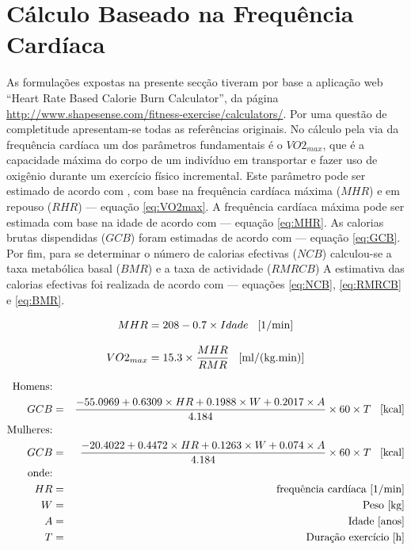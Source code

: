 \documentclass[a4paper,10pt]{report}
\begin{document}
\section{Cálculo Baseado na Frequência Cardíaca}
\label{sec:caloriasFcardio}
As formulações expostas na presente secção tiveram por base a aplicação web ``Heart Rate Based Calorie Burn Calculator'', 
da página \url{http://www.shapesense.com/fitness-exercise/calculators/}. Por uma questão de completitude apresentam-se todas as referências originais.
No cálculo pela via da frequência cardíaca um dos parâmetros fundamentais é o $VO2_{max}$, que é a capacidade máxima do corpo de um 
indivíduo em transportar e fazer uso de oxigênio durante um exercício físico incremental.
Este parâmetro pode ser estimado de acordo com \cite{VO2max}, com base na frequência cardíaca máxima ($MHR$) e em 
repouso ($RHR$) --- equação \ref{eq:VO2max}.
A frequência cardíaca máxima pode ser estimada com base na idade de acordo com \cite{MHR} --- equação \ref{eq:MHR}.
As calorias brutas dispendidas ($GCB$) foram estimadas de acordo com \cite{GCB} --- equação \ref{eq:GCB}.
Por fim, para se determinar o número de calorias efectivas ($NCB$) calculou-se a taxa metabólica basal ($BMR$) e a taxa de actividade ($RMRCB$)
A estimativa das calorias efectivas foi realizada de acordo com \cite{NCB} --- equações \ref{eq:NCB}, \ref{eq:RMRCB} e \ref{eq:BMR}.

\begin{equation} \label{eq:MHR} 
MHR = 208 - 0.7 \times Idade \text{\hspace*{0.3cm}[1/min]}
\end{equation}

\begin{equation} \label{eq:VO2max} 
VO2_{max} = 15.3 \times \frac{MHR}{RMR} \text{\hspace*{0.3cm}[ml/(kg.min)]}
\end{equation}

\begin{eqnarray} \label{eq:GCB}
\text{Homens:}&&\\ 
GCB &=& \frac{-55.0969 + 0.6309 \times HR + 0.1988 \times W + 0.2017 \times A}{4.184} \times 60 \times T \text{\hspace*{0.3cm}[kcal]}\nonumber\\
\text{Mulheres:}&&\nonumber\\ 
GCB &=& \frac{-20.4022 + 0.4472 \times HR + 0.1263 \times W + 0.074 \times A}{4.184} \times 60 \times T \text{\hspace*{0.3cm}[kcal]}\nonumber\\
\text{onde:}&& \nonumber\\
HR &=& \text{frequência cardíaca [1/min]}\nonumber\\ 
W &=& \text{Peso [kg]}\nonumber\\
A &=& \text{Idade [anos]}\nonumber\\
T &=& \text{Duração exercício [h]}\nonumber
\end{eqnarray}
\end{document}
